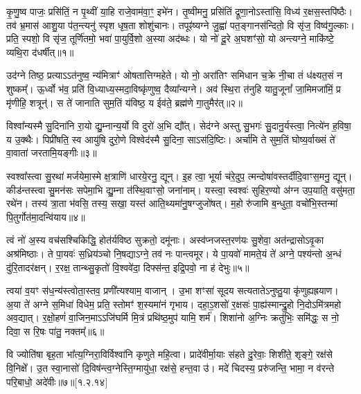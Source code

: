 कृ॒णु॒ष्व पाजः॒ प्रसि॑तिं॒ न पृ॒थ्वीं या॒हि राजे॒वाम॑वा॒ꣳ॒ इभे॑न। तृ॒ष्वीमनु॒ प्रसि॑तिं द्रूणा॒नोऽस्ता॑सि॒ विध्य॑ र॒क्षस॒स्तपि॑ष्ठैः। तव॑ भ्र॒मास॑ आशु॒या प॑त॒न्त्यनु॑ स्पृश धृष॒ता शोशु॑चानः। तपूꣴ॑ष्यग्ने जु॒ह्वा॑ पत॒ङ्गानस॑न्दितो॒ वि सृ॑ज॒ विष्व॑गु॒ल्काः। प्रति॒ स्पशो॒ वि सृ॑ज॒ तूर्णि॑तमो॒ भवा॑ पा॒युर्वि॒शो अ॒स्या अद॑ब्धः। यो नो॑ दू॒रे अ॒घशꣳ॑सो॒  यो अन्त्यग्ने॒ माकि॑ष्टे॒ व्यथि॒रा द॑धर्षीत्॥१॥

उद॑ग्ने तिष्ठ॒ प्रत्याऽऽत॑नुष्व॒ न्य॑मित्राꣳ॑ ओषतात्तिग्महेते। यो नो॒ अरा॑तिꣳ समिधान च॒क्रे नी॒चा तं ध॑क्ष्यत॒सं न शुष्कम्᳚। ऊ॒र्ध्वो भ॑व॒ प्रति॑ वि॒ध्याध्य॒स्मदा॒विष्कृ॑णुष्व॒ दैव्या᳚न्यग्ने। अव॑ स्थि॒रा त॑नुहि यातु॒जूनां᳚ जा॒मिमजा॑मिं॒ प्र मृ॑णीहि॒ शत्रून्॑। स ते॑ जानाति सुम॒तिं य॑विष्ठ॒ य ईव॑ते॒ ब्रह्म॑णे गा॒तुमैर॑त्॥२॥

विश्वा᳚न्यस्मै सु॒दिना॑नि रा॒यो द्यु॒म्नान्य॒र्यो वि दुरो॑ अ॒भि द्यौ᳚त्। सेद॑ग्ने अस्तु सु॒भगः॑ सु॒दानु॒र्यस्त्वा॒ नित्ये॑न ह॒विषा॒ य उ॒क्थैः। पिप्री॑षति॒ स्व आयु॑षि दुरो॒णे विश्वेद॑स्मै सु॒दिना॒ साऽस॑दि॒ष्टिः। अर्चा॑मि ते सुम॒तिं घोष्य॒र्वाख्सं ते॑ वा॒वाता॑ जरतामि॒यङ्गीः॥३॥
 
स्वश्वा᳚स्त्वा सु॒रथा॑ मर्जयेमा॒स्मे क्ष॒त्राणि॑ धारये॒रनु॒ द्यून्। इ॒ह त्वा॒ भूर्या च॑रे॒दुप॒ त्मन्दोषा॑\-वस्तर्दीदि॒वाꣳ\-स॒मनु॒ द्यून्। कीड॑न्तस्त्वा सु॒मन॑सः सपेमा॒भि द्यु॒म्ना त॑स्थि॒वाꣳसो॒ जना॑नाम्। यस्त्वा॒ स्वश्वः॑ सुहिर॒ण्यो अ॑ग्न उप॒याति॒ वसु॑मता॒ रथे॑न। तस्य॑ त्रा॒ता भ॑वसि॒ तस्य॒ सखा॒ यस्त॑ आति॒थ्यमा॑नु॒षग्जुजो॑षत्। म॒हो रु॑जामि ब॒न्धुता॒ वचो॑भि॒स्तन्मा॑ पि॒तुर्गोत॑मा॒दन्वि॑याय॥४॥

त्वं नो॑ अ॒स्य वच॑सश्चिकिद्धि॒ होत॑र्यविष्ठ सुक्रतो॒ दमू॑नाः। अस्व॑प्नजस्त॒रण॑यः सु॒शेवा॒ अत॑न्द्रासोऽवृ॒का अश्र॑मिष्ठाः। ते पा॒यवः॑ स॒ध्रिय॑ञ्चो नि॒षद्याऽग्ने॒ तव॑ नः पान्त्वमूर। ये पा॒यवो॑ मामते॒यं ते॑ अग्ने॒ पश्य॑न्तो अ॒न्धं दु॑रि॒तादर॑क्षन्। र॒रक्ष॒ तान्थ्सु॒कृतो॑ वि॒श्ववे॑दा॒ दिफ्स॑न्त॒ इद्रि॒पवो॒ ना ह॑ देभुः॥५॥
 
त्वया॑ व॒यꣳ स॑ध॒न्य॑स्त्वोता॒स्तव॒ प्रणी᳚त्यश्याम॒ वाजान्। उ॒भा शꣳसा॑ सूदय सत्यतातेऽनुष्ठु॒या कृ॑णुह्यह्रयाण। अ॒या ते॑ अग्ने स॒मिधा॑ विधेम॒ प्रति॒ स्तोमꣳ॑ श॒स्यमा॑नं गृभाय। दहा॒ऽ॒शसो॑ र॒क्षसः॑ पा॒ह्य॑स्मान्द्रु॒हो नि॒दोऽमि॑त्रमहो अव॒द्यात्। र॒क्षो॒हणं॑ वा॒जिन॒माऽऽजि॑घर्मि मि॒त्रं प्रथि॑ष्ठ॒मुप॑ यामि॒ शर्म॑। शिशा॑नो अ॒ग्निः क्रतु॑भिः॒ समि॑द्धः॒ स नो॒ दिवा॒ स रि॒षः पा॑तु॒ नक्तम्᳚॥६॥

 वि ज्योति॑षा बृह॒ता भा᳚त्य॒ग्निरा॒विर्विश्वा॑नि कृणुते महि॒त्वा। प्रादे॑वीर्मा॒याः स॑हते दु॒रेवाः॒ शिशी॑ते॒ शृङ्गे॒ रक्ष॑से वि॒निक्षे᳚। उ॒त स्वा॒नासो॑ दि॒विष॑न्त्व॒ग्नेस्ति॒ग्मायु॑धा॒ रक्ष॑से॒ हन्त॒वा उ॑। मदे॑ चिदस्य॒ प्ररु॑जन्ति॒ भामा॒ न व॑रन्ते परि॒बाधो॒ अदे॑वीः॥७॥[१.२.१४]

